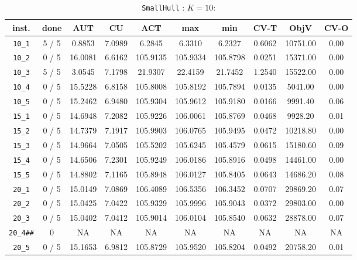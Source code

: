 \begin{table}[h!]
\begin{center}
\small
\begin{tabular}{| c | c | c | c | c | c | c | c | c | c |}
\hline
inst. & done & AUT & CU & ACT & max & min & CV-T & ObjV & CV-O \\
\hline
\verb|10_1| & 5 / 5 & 0.8853 & 7.0989 & 6.2845 & 6.3310 & 6.2327 & 0.6062 & 10751.00 & 0.00\\ 
\verb|10_2| & 0 / 5 & 16.0081 & 6.6162 & 105.9135 & 105.9334 & 105.8798 & 0.0251 & 15371.00 & 0.00\\ 
\verb|10_3| & 5 / 5 & 3.0545 & 7.1798 & 21.9307 & 22.4159 & 21.7452 & 1.2540 & 15522.00 & 0.00\\ 
\verb|10_4| & 0 / 5 & 15.5228 & 6.8158 & 105.8008 & 105.8192 & 105.7894 & 0.0135 & 5041.00 & 0.00\\ 
\verb|10_5| & 0 / 5 & 15.2462 & 6.9480 & 105.9304 & 105.9612 & 105.9180 & 0.0166 & 9991.40 & 0.06\\ 
\verb|15_1| & 0 / 5 & 14.6948 & 7.2082 & 105.9226 & 106.0061 & 105.8769 & 0.0468 & 9928.20 & 0.01\\ 
\verb|15_2| & 0 / 5 & 14.7379 & 7.1917 & 105.9903 & 106.0765 & 105.9495 & 0.0472 & 10218.80 & 0.00\\ 
\verb|15_3| & 0 / 5 & 14.9664 & 7.0505 & 105.5202 & 105.6245 & 105.4579 & 0.0615 & 15180.60 & 0.09\\ 
\verb|15_4| & 0 / 5 & 14.6506 & 7.2301 & 105.9249 & 106.0186 & 105.8916 & 0.0498 & 14461.00 & 0.00\\ 
\verb|15_5| & 0 / 5 & 14.8802 & 7.1165 & 105.8948 & 106.0127 & 105.8405 & 0.0643 & 14686.20 & 0.08\\ 
\verb|20_1| & 0 / 5 & 15.0149 & 7.0869 & 106.4089 & 106.5356 & 106.3452 & 0.0707 & 29869.20 & 0.07\\ 
\verb|20_2| & 0 / 5 & 15.0425 & 7.0422 & 105.9329 & 105.9996 & 105.9043 & 0.0372 & 29803.00 & 0.00\\ 
\verb|20_3| & 0 / 5 & 15.0402 & 7.0412 & 105.9014 & 106.0104 & 105.8540 & 0.0632 & 28878.00 & 0.07\\ 
\verb|20_4##| & 0 & NA & NA & NA & NA & NA & NA & NA & NA \\ 
\verb|20_5| & 0 / 5 & 15.1653 & 6.9812 & 105.8729 & 105.9520 & 105.8204 & 0.0492 & 20758.20 & 0.01\\ 
\hline
\end{tabular}
\caption{\texttt{SmallHull} : $K=10$: }
\label{table:hull:10}
\end{center}
\end{table}

